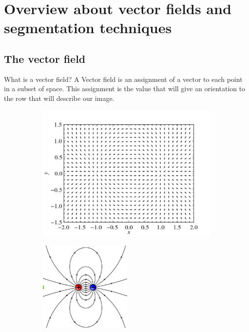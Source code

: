 
\chapter{Overview about vector fields and segmentation techniques}
\section{The vector field}
What is a vector field? A Vector field is an assignment of a vector to each point in a subset of space. This assignment is the value that will give an orientation to the row that will describe our image.
\begin{figure}
	\centering
	\begin{subfigure}[b]{0.5\textwidth}
        \includegraphics[width=\textwidth]{img/fieldex.png}
        \caption{ }
        \label{fig:field}
    \end{subfigure}
    \begin{subfigure}[b]{0.5\textwidth}
		\includegraphics[width=\textwidth]{img/dipole.png}

\end{subfigure}
\end{figure}

